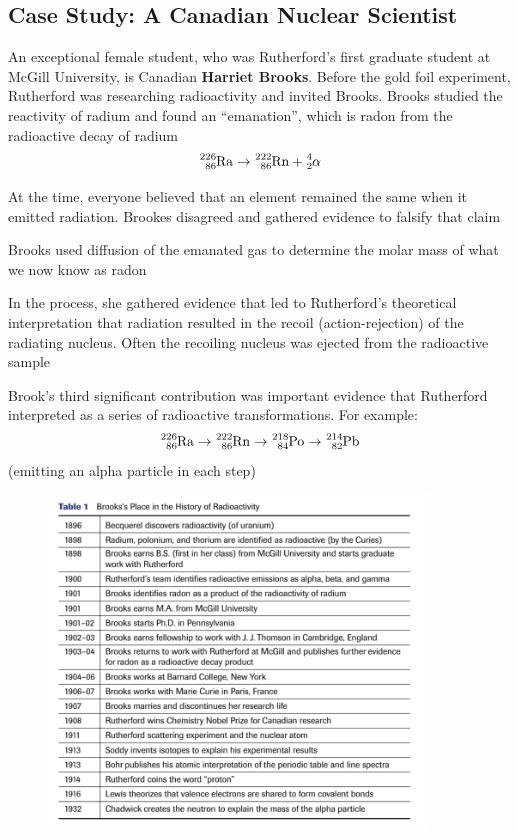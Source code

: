 \subsection{Case Study: A Canadian Nuclear Scientist}
An exceptional female student, who was Rutherford's first graduate student at McGill University,
is Canadian \textbf{Harriet Brooks}. Before the gold foil experiment, Rutherford was researching
radioactivity and invited Brooks. Brooks studied the reactivity of radium and found an ``emanation'',
which is radon from the radioactive decay of radium
\[
    \ch{^{226}_{86}Ra}\to \ch{^{222}_{86}Rn}+\ch{^{4}_{2}\alpha}
\]
\begin{bulleted-list}
    \item At the time, everyone believed that an element remained the same when it emitted radiation. Brookes
        disagreed and gathered evidence to falsify that claim
    \item Brooks used diffusion of the emanated gas to determine the molar mass of what we now
        know as radon
    \item In the process, she gathered evidence that led to Rutherford's theoretical interpretation
        that radiation resulted in the recoil (action-rejection) of the radiating nucleus. Often
        the recoiling nucleus was ejected from the radioactive sample
    \item Brook's third significant contribution was important evidence that Rutherford interpreted
        as a series of radioactive transformations. For example:
        \[
            \ch{^{226}_{86}Ra}\to \ch{^{222}_{86}Rn}\to \ch{^{218}_{84}Po}\to \ch{^{214}_{82}Pb}
        \]
        (emitting an alpha particle in each step)
\end{bulleted-list}

\begin{figure}[ht!]
    \centering
    \includegraphics[width=0.9\textwidth]{../figures/history-of-radioactivity.png}
\end{figure}
